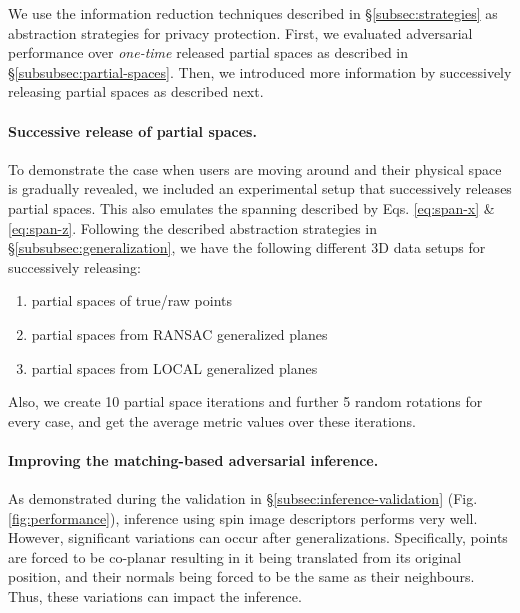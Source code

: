 We use the information reduction techniques described in \S\ref{subsec:strategies} as abstraction strategies for privacy protection. First, we evaluated adversarial performance over \textit{one-time} released partial spaces as described in \S\ref{subsubsec:partial-spaces}. Then, we introduced more information by successively releasing partial spaces as described next.

\paragraph{Successive release of partial spaces.}\label{subsubsec:successive-release}
To demonstrate the case when users are moving around and their physical space is gradually revealed, we included an experimental setup that successively releases partial spaces. This also emulates the spanning described by Eqs. \ref{eq:span-x} \& \ref{eq:span-z}. Following the described abstraction strategies in \S\ref{subsubsec:generalization}, we have the following different 3D data setups for successively releasing:

\begin{enumerate}[leftmargin=*]
 \setlength{\parskip}{0.1mm}
  \setlength\itemsep{0em}
	\item partial spaces of true/raw points
	\item partial spaces from RANSAC generalized planes
	\item partial spaces from LOCAL generalized planes
\end{enumerate}

Also, we create 10 partial space iterations and further 5 random rotations for every case, and get the average metric values over these iterations.

\paragraph{Improving the matching-based adversarial inference.}\label{subsubsec:improved-matching}
As demonstrated during the validation in \S\ref{subsec:inference-validation} (Fig. \ref{fig:performance}), inference using spin image descriptors performs very well. However, significant variations can occur after generalizations. Specifically, points are forced to be co-planar resulting in it being translated from its original position, and their normals being forced to be the same as their neighbours. Thus, these variations can impact the inference.

